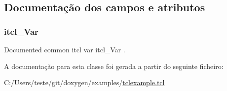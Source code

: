 \subsection{Documentação dos campos e atributos}
\hypertarget{classns_1_1itcl__class_ad36615943b6e0b072f672602111414e7}{
\subsubsection[{itcl\-\_\-\-Var}]{\setlength{\rightskip}{0pt plus 5cm}itcl\-\_\-\-Var\hspace{0.3cm}{\ttfamily [static]}}}\label{classns_1_1itcl__class_ad36615943b6e0b072f672602111414e7}
Documented common itcl var {\ttfamily itcl\-\_\-\-Var} . 

A documentação para esta classe foi gerada a partir do seguinte ficheiro\-:\begin{DoxyCompactItemize}
\item 
C\-:/\-Users/teste/git/doxygen/examples/\hyperlink{tclexample_8tcl}{tclexample.\-tcl}\end{DoxyCompactItemize}
